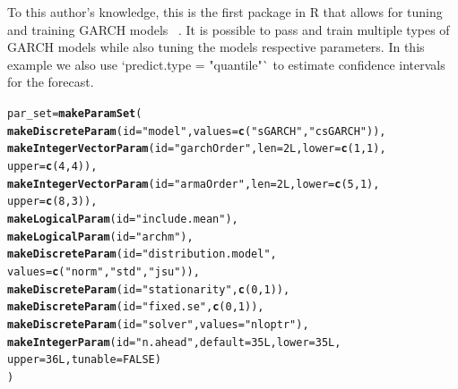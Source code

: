 \documentclass{article}\usepackage[]{graphicx}\usepackage[]{color}
\makeatletter
\newcommand{\hlnum}[1]{\textcolor[rgb]{0.686,0.059,0.569}{#1}}%
\newcommand{\hlstr}[1]{\textcolor[rgb]{0.192,0.494,0.8}{#1}}%
\newcommand{\hlstd}[1]{\textcolor[rgb]{0.345,0.345,0.345}{#1}}%
\newcommand{\hlkwb}[1]{\textcolor[rgb]{0.69,0.353,0.396}{#1}}%
\newcommand{\hlkwc}[1]{\textcolor[rgb]{0.333,0.667,0.333}{#1}}%
\newcommand{\hlkwd}[1]{\textcolor[rgb]{0.737,0.353,0.396}{\textbf{#1}}}%
\newenvironment{kframe}{%
 \def\at@end@of@kframe{}%
 \ifinner\ifhmode%
  \def\at@end@of@kframe{\end{minipage}}%
  \begin{minipage}{\columnwidth}%
 \fi\fi%
 \def\FrameCommand##1{\hskip\@totalleftmargin \hskip-\fboxsep
 \colorbox{shadecolor}{##1}\hskip-\fboxsep
     \hskip-\linewidth \hskip-\@totalleftmargin \hskip\columnwidth}%
 \MakeFramed {\advance\hsize-\width
   \@totalleftmargin\z@ \linewidth\hsize
   \@setminipage}}%
 {\par\unskip\endMakeFramed%
 \at@end@of@kframe}
\newenvironment{knitrout}{}{} %
\theoremstyle{definition}
\let\proglang=\textsf
\makeatother
\begin{document}
To this author's knowledge, this is the first package in \proglang{R} that allows for tuning and training GARCH models ~\cite{garchengels}. It is possible to pass and train multiple types of GARCH models while also tuning the models respective parameters. In this example we also use `predict.type = "quantile"` to estimate confidence intervals for the forecast.

\begin{knitrout}
\color{fgcolor}\begin{kframe}
\begin{alltt}
\hlstd{par_set} \hlkwb{=} \hlkwd{makeParamSet}\hlstd{(}
  \hlkwd{makeDiscreteParam}\hlstd{(}\hlkwc{id} \hlstd{=} \hlstr{"model"}\hlstd{,} \hlkwc{values} \hlstd{=} \hlkwd{c}\hlstd{(}\hlstr{"sGARCH"}\hlstd{,} \hlstr{"csGARCH"}\hlstd{)),}
  \hlkwd{makeIntegerVectorParam}\hlstd{(}\hlkwc{id} \hlstd{=} \hlstr{"garchOrder"}\hlstd{,} \hlkwc{len} \hlstd{=} \hlnum{2L}\hlstd{,} \hlkwc{lower} \hlstd{=} \hlkwd{c}\hlstd{(}\hlnum{1}\hlstd{,}\hlnum{1}\hlstd{),}
                         \hlkwc{upper} \hlstd{=} \hlkwd{c}\hlstd{(}\hlnum{4}\hlstd{,}\hlnum{4}\hlstd{)),}
  \hlkwd{makeIntegerVectorParam}\hlstd{(}\hlkwc{id} \hlstd{=} \hlstr{"armaOrder"}\hlstd{,} \hlkwc{len} \hlstd{=} \hlnum{2L}\hlstd{,} \hlkwc{lower} \hlstd{=} \hlkwd{c}\hlstd{(}\hlnum{5}\hlstd{,}\hlnum{1}\hlstd{),}
                         \hlkwc{upper} \hlstd{=} \hlkwd{c}\hlstd{(}\hlnum{8}\hlstd{,}\hlnum{3}\hlstd{)),}
  \hlkwd{makeLogicalParam}\hlstd{(}\hlkwc{id} \hlstd{=} \hlstr{"include.mean"}\hlstd{),}
  \hlkwd{makeLogicalParam}\hlstd{(}\hlkwc{id} \hlstd{=} \hlstr{"archm"}\hlstd{),}
  \hlkwd{makeDiscreteParam}\hlstd{(}\hlkwc{id} \hlstd{=} \hlstr{"distribution.model"}\hlstd{,}
                    \hlkwc{values} \hlstd{=} \hlkwd{c}\hlstd{(}\hlstr{"norm"}\hlstd{,}\hlstr{"std"}\hlstd{,}\hlstr{"jsu"}\hlstd{)),}
  \hlkwd{makeDiscreteParam}\hlstd{(}\hlkwc{id} \hlstd{=} \hlstr{"stationarity"}\hlstd{,} \hlkwd{c}\hlstd{(}\hlnum{0}\hlstd{,}\hlnum{1}\hlstd{)),}
  \hlkwd{makeDiscreteParam}\hlstd{(}\hlkwc{id} \hlstd{=} \hlstr{"fixed.se"}\hlstd{,} \hlkwd{c}\hlstd{(}\hlnum{0}\hlstd{,}\hlnum{1}\hlstd{)),}
  \hlkwd{makeDiscreteParam}\hlstd{(}\hlkwc{id} \hlstd{=} \hlstr{"solver"}\hlstd{,} \hlkwc{values} \hlstd{=} \hlstr{"nloptr"}\hlstd{),}
  \hlkwd{makeIntegerParam}\hlstd{(}\hlkwc{id} \hlstd{=} \hlstr{"n.ahead"}\hlstd{,} \hlkwc{default} \hlstd{=} \hlnum{35L}\hlstd{,} \hlkwc{lower} \hlstd{=} \hlnum{35L}\hlstd{,}
                   \hlkwc{upper} \hlstd{=} \hlnum{36L}\hlstd{,} \hlkwc{tunable} \hlstd{=} \hlnum{FALSE}\hlstd{)}
\hlstd{)}


\end{alltt}
\end{kframe}
\end{knitrout}
\end{document}
